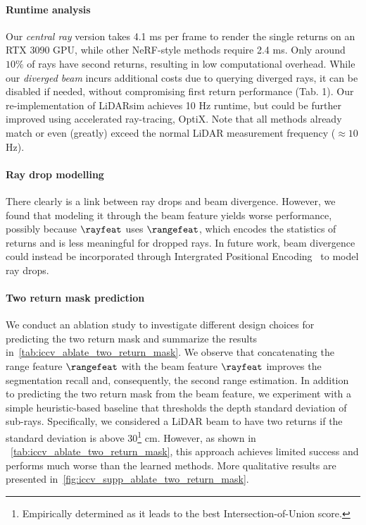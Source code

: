 \paragraph{Runtime analysis}
Our \textit{central ray} version takes 4.1 ms per frame to render the single returns on an RTX 3090 GPU, while other NeRF-style methods require 2.4 ms. Only around $10\%$ of rays have second returns, resulting in low computational overhead. While our \textit{diverged beam} incurs additional costs due to querying diverged rays, it can be disabled if needed, without compromising first return performance (\cf Tab. 1). Our re-implementation of LiDARsim achieves 10 Hz runtime, but could be further improved using accelerated ray-tracing, \eg OptiX. Note that all methods already match or even (greatly) exceed the normal LiDAR measurement frequency (${\approx}10$ Hz). 

\paragraph{Ray drop modelling}
There clearly is a link between ray drops and beam divergence. However, we found that modeling it through the beam feature yields worse performance, possibly because $\rayfeat$ uses $\rangefeat$, which encodes the statistics of returns and is less meaningful for dropped rays. In future work, beam divergence could instead be incorporated through Intergrated Positional Encoding~\cite{barron2023zipnerf} to model ray drops.

\paragraph{Two return mask prediction}

We conduct an ablation study to investigate different design choices for predicting the two return mask and summarize the results in~\cref{tab:iccv_ablate_two_return_mask}. We observe that concatenating the range feature $\rangefeat$ with the beam feature $\rayfeat$ improves the segmentation recall and, consequently, the second range estimation. In addition to predicting the two return mask from the beam feature, we experiment with a simple heuristic-based baseline that thresholds the depth standard deviation of sub-rays. Specifically, we considered a LiDAR beam to have two returns if the standard deviation is above 30\footnote{Empirically determined as it leads to the best Intersection-of-Union score.} cm. However, as shown in ~\cref{tab:iccv_ablate_two_return_mask}, this approach achieves limited success and performs much worse than the learned methods. More qualitative results are presented in~\cref{fig:iccv_supp_ablate_two_return_mask}. 

